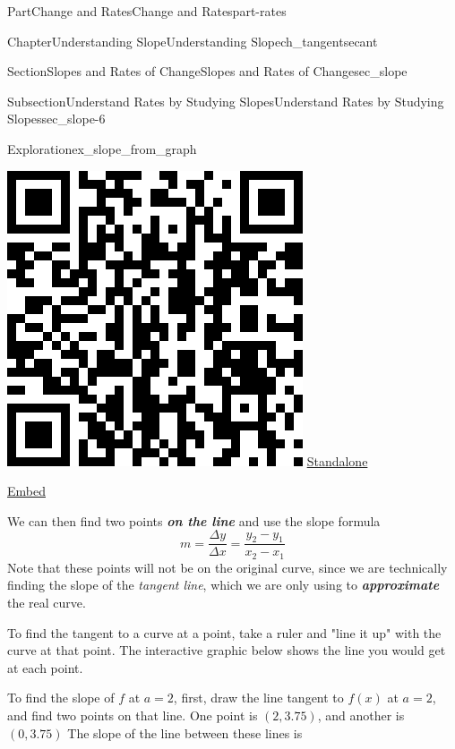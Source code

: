 \documentclass[oneside,10pt,]{tufte-book}
\newcommand{\alert}[1]{\textbf{\textit{#1}}}
\numberwithin{equation}{chapter}
\begin{document}
\begin{partptx}{Part}{Change and Rates}{}{Change and Rates}{}{}{part-rates}
\begin{chapterptx}{Chapter}{Understanding Slope}{}{Understanding Slope}{}{}{ch_tangentsecant}
\begin{sectionptx}{Section}{Slopes and Rates of Change}{}{Slopes and Rates of Change}{}{}{sec_slope}
\begin{subsectionptx}{Subsection}{Understand Rates by Studying Slopes}{}{Understand Rates by Studying Slopes}{}{}{sec_slope-6}
\begin{exploration}{Exploration}{}{ex_slope_from_graph}
\begin{enumerate}[font=\bfseries,label=(\alph*),ref=\alph*]
\begin{sidebyside}{2}{0.075}{0.075}{0.17}
\begin{sbspanel}{0.21}
\includegraphics[width=\linewidth]{generated/qrcode/ex_slope_from_graph-3-2-2.png}
\href{http://webwork.bridgew.edu/oer/functions_at_work/ex_slope_from_graph-3-2-2.html}{Standalone}%
\par
\href{http://webwork.bridgew.edu/oer/functions_at_work/ex_slope_from_graph-3-2-2-if.html}{Embed}%
\end{sbspanel}%
\end{sidebyside}%
\par
We can then find two points \alert{on the line} and use the slope formula%
\begin{equation*}
m = \dfrac{\Delta y}{\Delta x} = \dfrac{y_2-y_1}{x_2-x_1}
\end{equation*}
Note that these points will not be on the original curve, since we are technically finding the slope of the \emph{tangent line}, which we are only using to \alert{approximate} the real curve.%
\par
To find the tangent to a curve at a point, take a ruler and "line it up" with the curve at that point. The interactive graphic below shows the line you would get at each point.%
\par
To find the slope of \(f\) at \(a=2\), first, draw the line tangent to \(f(x)\) at \(a=2\), and find two points on that line. One point is \((2,3.75)\), and another is \((0,3.75)\) The slope of the line between these lines is%

\end{enumerate}
\end{exploration}
\end{subsectionptx}
\end{sectionptx}
\end{chapterptx}
\end{partptx}
\end{document}
